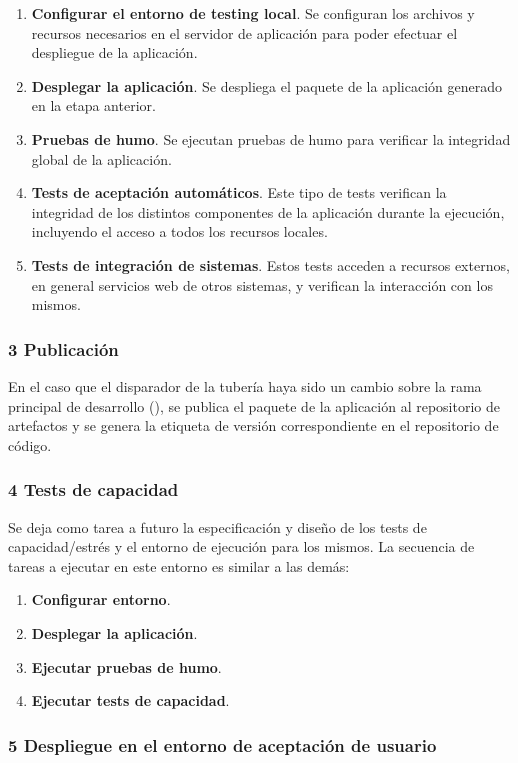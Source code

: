 \begin{enumerate}
\item \textbf{Configurar el entorno de testing local}. Se configuran
  los archivos y recursos necesarios en el servidor de aplicación para
  poder efectuar el despliegue de la aplicación.
\item \textbf{Desplegar la aplicación}. Se despliega el paquete de la
  aplicación generado en la etapa anterior.
\item \textbf{Pruebas de humo}. Se ejecutan pruebas de humo para
  verificar la integridad global de la aplicación.
\item \textbf{Tests de aceptación automáticos}. Este tipo de tests
  verifican la integridad de los distintos componentes de la
  aplicación durante la ejecución, incluyendo el acceso a todos los
  recursos locales.
\item \textbf{Tests de integración de sistemas}. Estos tests acceden a
  recursos externos, en general servicios web de otros sistemas, y
  verifican la interacción con los mismos.
\end{enumerate}
\subsubsection{3 Publicación}

En el caso que el disparador de la tubería haya sido un cambio sobre
la rama principal de desarrollo (), se publica el
paquete de la aplicación al repositorio de artefactos y se genera la
etiqueta de versión correspondiente en el repositorio de código.

\subsubsection{4 Tests de capacidad}

Se deja como tarea a futuro la especificación y diseño de los tests de
capacidad/estrés y el entorno de ejecución para los mismos. La
secuencia de tareas a ejecutar en este entorno es similar a las demás:

\begin{enumerate}
\item \textbf{Configurar entorno}.
\item \textbf{Desplegar la aplicación}.
\item \textbf{Ejecutar pruebas de humo}.
\item \textbf{Ejecutar tests de capacidad}.
\end{enumerate}
\subsubsection{5 Despliegue en el entorno de aceptación de usuario}

